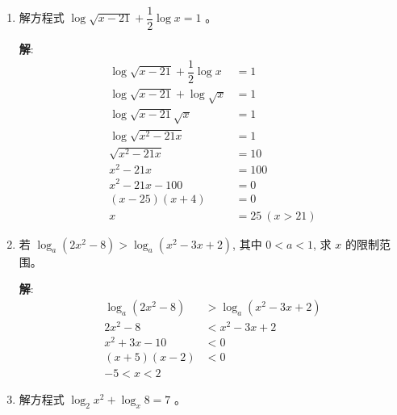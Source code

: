 \documentclass{report}
\newcommand{\sol}{\vspace{0.2cm}\textbf{解}:}
\begin{document}
\begin{multicols*}{2}
\begin{enumerate}[leftmargin=*]
        \item 解方程式 $\log \sqrt{x-21}+\dfrac{1}{2} \log x=1$ 。

              \sol{}
              \begin{align*}
                  \log \sqrt{x-21} + \dfrac{1}{2} \log x & = 1            \\
                  \log \sqrt{x-21} + \log \sqrt{x}       & = 1            \\
                  \log \sqrt{x-21} \sqrt{x}              & = 1            \\
                  \log \sqrt{x^2 - 21x}                  & = 1            \\
                  \sqrt{x^2 - 21x}                       & = 10           \\
                  x^2 - 21x                              & = 100          \\
                  x^2 - 21x - 100                        & = 0            \\
                  (x - 25)(x + 4)                        & = 0            \\
                  x                                      & = 25\ (x > 21)
              \end{align*}

        \item 若 $\log _a\left(2 x^2-8\right)>\log _a\left(x^2-3 x+2\right)$, 其中 $0<a<1$, 求 $x$ 的限制范围。

              \sol{}
              \begin{align*}
                  \log_a(2x^2 - 8) & > \log_a(x^2 - 3x + 2) \\
                  2x^2 - 8         & < x^2 - 3x + 2         \\
                  x^2 + 3x - 10    & < 0                    \\
                  (x + 5)(x - 2)   & < 0                    \\
                  -5 < x < 2
              \end{align*}

        \item 解方程式 $\log _2 x^2+\log _x 8=7$ 。


\end{enumerate}
\end{multicols*}
\end{document}
